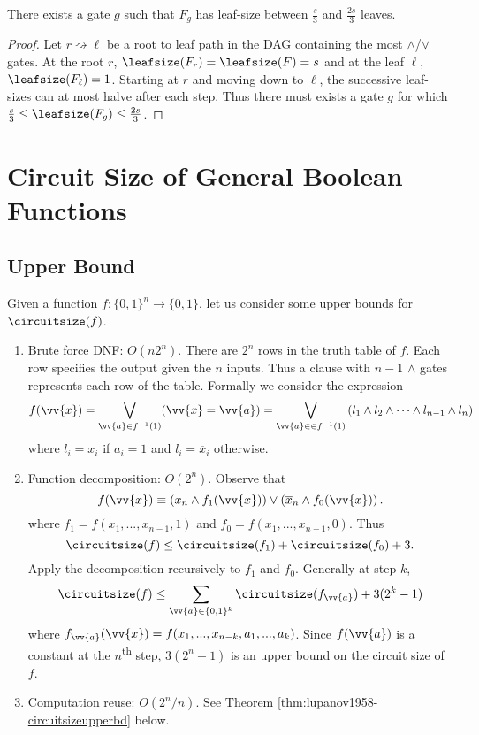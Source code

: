 	\begin{claim}
		\label{claim:pickgoodgate}
		There exists a gate $g$ such that $F_g$ has leaf-size between $\frac{s}{3}$ and $\frac{2s}{3}$ leaves.
	\end{claim}
	\begin{proof}
		Let $r \rightsquigarrow \ell$ be a root to leaf path in the DAG containing the most $\land$/$\lor$ gates. At the root $r$, $\leafsize(F_r) = \leafsize(F) = s$ and at the leaf $\ell$, $\leafsize(F_{\ell}) = 1$. Starting at $r$ and moving down to $\ell$, the successive leaf-sizes can at most halve after each step. Thus there must exists a gate $g$ for which $\frac{s}{3} \leq \leafsize(F_g) \leq \frac{2s}{3}$.
	\end{proof}

\section{Circuit Size of General Boolean Functions}
\label{sec:circuitsize}

	\subsection{Upper Bound}
	\label{ssec:circuitsizeupperbd}
	Given a function $f: \{0,1\}^n \rightarrow \{0,1\}$, let us consider some upper bounds for $\circuitsize(f)$.
	\begin{enumerate}
		\item Brute force DNF: $O(n2^n)$. There are $2^n$ rows in the truth table of $f$. Each row specifies the output given the $n$ inputs. Thus a clause with $n-1$ $\land$ gates represents each row of the table. Formally we consider the expression
		\[f(\vv{x}) = \bigvee_{\vv{a} \in f^{-1}(1)} (\vv{x} = \vv{a}) = \bigvee_{\vv{a} \in  \in f^{-1}(1)} \left(l_1 \land l_2 \land \cdots \land l_{n-1} \land l_n\right)\]
		where $l_i = x_i$ if $a_i = 1$ and $l_i = \overline{x}_i$ otherwise.
		\item Function decomposition: $O(2^n)$. Observe that 
		\[f(\vv{x}) \equiv \left(x_n \land f_1(\vv{x})\right) \lor \left(\overline{x}_n \land f_0(\vv{x})\right).\]
		where $f_1 = f(x_1, ..., x_{n-1}, 1)$ and $f_0 = f(x_1, ..., x_{n-1}, 0)$. Thus
		\[\circuitsize(f) \leq \circuitsize(f_1) + \circuitsize(f_0) + 3.\]
		Apply the decomposition recursively to $f_1$ and $f_0$. Generally at step $k$,
		\[\circuitsize(f) \leq \sum_{\vv{a} \in \{0,1\}^k}\circuitsize(f_{\vv{a}}) + 3(2^k - 1)\]
		where $f_{\vv{a}}(\vv{x}) = f(x_1, ..., x_{n-k}, a_1, ..., a_k)$. Since $f(\vv{a})$ is a constant at the $n$\textsuperscript{th} step, $3(2^n - 1)$ is an upper bound on the circuit size of $f$. 
		\item Computation reuse: $O(2^n/n)$. See Theorem \ref{thm:lupanov1958-circuitsizeupperbd} below. 
	\end{enumerate}
	
